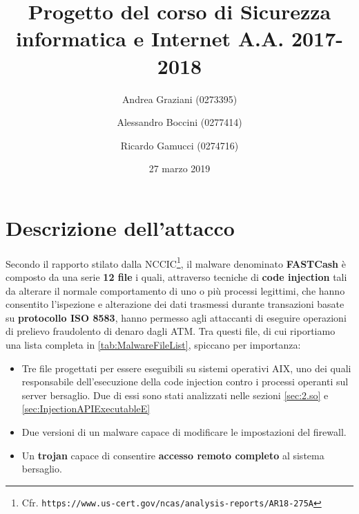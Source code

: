 \documentclass[10pt,a4paper, titlepage]{report}
\title{Progetto del corso di Sicurezza informatica e Internet A.A. 2017-2018}
\author[1]{Andrea Graziani (0273395)}
\author[1]{Alessandro Boccini (0277414)}
\author[1]{Ricardo Gamucci (0274716)}
\affil[1]{Università degli Studi di Roma Tor Vergata}
\date{27 marzo 2019}
\begin{document}
\maketitle
\tableofcontents
\newpage

\chapter{Descrizione dell'attacco}

Secondo il rapporto stilato dalla NCCIC\footnote{Cfr. \texttt{https://www.us-cert.gov/ncas/analysis-reports/AR18-275A}}, il malware denominato \textbf{FASTCash} è composto da una serie \textbf{12 file} i quali, attraverso tecniche di \textbf{code injection} tali da alterare il normale comportamento di uno o più processi legittimi, che hanno consentito l'ispezione e alterazione dei dati trasmessi durante transazioni basate su \textbf{protocollo ISO 8583}, hanno permesso agli attaccanti di eseguire operazioni di prelievo fraudolento di denaro dagli ATM.
Tra questi file, di cui riportiamo una lista completa in \ref{tab:MalwareFileList}, spiccano per importanza:

\begin{itemize}
\item Tre file progettati per essere eseguibili su sistemi operativi AIX, uno dei quali responsabile dell'esecuzione della code injection contro i processi operanti sul server bersaglio. Due di essi sono stati analizzati nelle sezioni \ref{sec:2.so} e \ref{sec:InjectionAPIExecutableE}

\item Due versioni di un malware capace di modificare le impostazioni del firewall.

\item Un \textbf{trojan} capace di consentire \textbf{accesso remoto completo} al sistema bersaglio.
\end{itemize}
\end{document}

